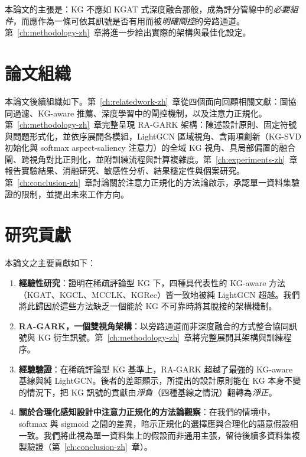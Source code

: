 本論文的主張是：KG 不應如 KGAT 式深度融合那般，成為評分管線中的\emph{必要組件}，而應作為一條可依其訊號是否有用而被\emph{明確閘控}的旁路通道。第~\ref{ch:methodology-zh}~章將進一步給出實際的架構與最佳化設定。

\section{論文組織}
\label{sec:intro-organization-zh}

本論文後續組織如下。第~\ref{ch:relatedwork-zh}~章從四個面向回顧相關文獻：圖協同過濾、KG-aware 推薦、深度學習中的閘控機制，以及注意力正規化。第~\ref{ch:methodology-zh}~章完整呈現 RA-GARK 架構：陳述設計原則、固定符號與問題形式化，並依序展開各模組，LightGCN 區域視角、含兩項創新（KG-SVD 初始化與 softmax aspect-saliency 注意力）的全域 KG 視角、具局部偏置的融合閘、跨視角對比正則化，並附訓練流程與計算複雜度。第~\ref{ch:experiments-zh}~章報告實驗結果、消融研究、敏感性分析、結果穩定性與個案研究。第~\ref{ch:conclusion-zh}~章討論關於注意力正規化的方法論啟示，承認單一資料集驗證的限制，並提出未來工作方向。

\section{研究貢獻}
\label{sec:intro-contributions-zh}

本論文之主要貢獻如下：

\begin{enumerate}
  \item \textbf{經驗性研究}：證明在稀疏評論型 KG 下，四種具代表性的 KG-aware 方法（KGAT、KGCL、MCCLK、KGRec）皆一致地被純 LightGCN 超越。我們將此歸因於這些方法缺乏一個能於 KG 不可靠時將其脫接的架構機制。

  \item \textbf{RA-GARK，一個雙視角架構}：以旁路通道而非深度融合的方式整合協同訊號與 KG 衍生訊號。第~\ref{ch:methodology-zh}~章將完整展開其架構與訓練程序。

  \item \textbf{經驗驗證}：在稀疏評論型 KG 基準上，RA-GARK 超越了最強的 KG-aware 基線與純 LightGCN。後者的差距顯示，所提出的設計原則能在 KG 本身不變的情況下，把 KG 訊號的貢獻由\emph{淨負}（四種基線之情況）翻轉為\emph{淨正}。

  \item \textbf{關於合理化感知設計中注意力正規化的方法論觀察}：在我們的情境中，softmax 與 sigmoid 之間的差異，暗示正規化的選擇應與合理化的語意假設相一致。我們將此視為單一資料集上的假設而非通用主張，留待後續多資料集複製驗證（第~\ref{ch:conclusion-zh}~章）。
\end{enumerate}
